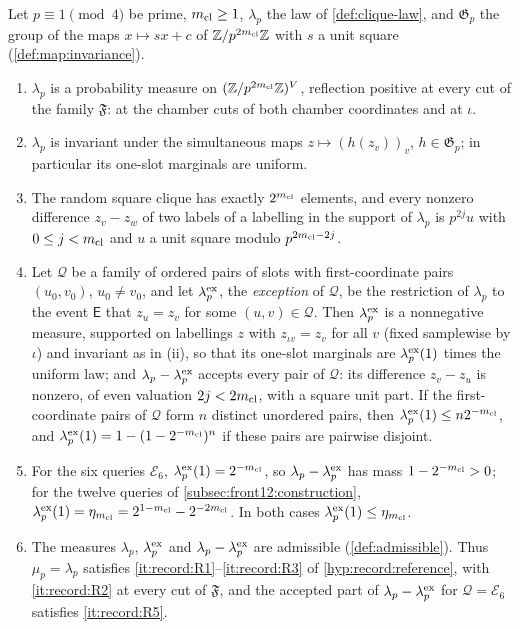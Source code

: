 \begin{lemma}\label{lem:frontier:iidlocal}
Let $p\equiv1\pmod4$ be prime, $m_{\mathrm{cl}}\ge1$, $\lambda_p$ the law of
\cref{def:clique-law}, and $\mathfrak G_p$ the group of the maps
$x\mapsto sx+c$ of $\mathbb Z/p^{2m_{\mathrm{cl}}}\mathbb Z$ with $s$ a unit square
(\cref{def:map:invariance}).
\begin{enumerate}[label=(\roman*)]
\item $\lambda_p$ is a probability measure on $(\mathbb Z/p^{2m_{\mathrm{cl}}}\mathbb Z)^V$, reflection
 positive at every cut of the family $\mathfrak F$: at the chamber cuts of both
 chamber coordinates and at $\iota$.
\item $\lambda_p$ is invariant under the simultaneous maps $z\mapsto(h(z_v))_v$,
 $h\in\mathfrak G_p$; in particular its one-slot marginals are uniform.
\item The random square clique has exactly $2^{m_{\mathrm{cl}}}$ elements, and every
 nonzero difference $z_v-z_w$ of two labels of a labelling in the support of
 $\lambda_p$ is $p^{2j}u$ with $0\le j<m_{\mathrm{cl}}$ and $u$ a unit square modulo
 $p^{2m_{\mathrm{cl}}-2j}$.
\item Let $\mathcal Q$ be a family of ordered pairs of slots with
 first-coordinate pairs $(u_0,v_0)$, $u_0\ne v_0$, and let $\lambda^{\rm ex}_p$,
 the \emph{exception} of $\mathcal Q$, be the restriction of $\lambda_p$ to the
 event $\mathsf E$ that $z_u=z_v$ for some $(u,v)\in\mathcal Q$. Then
 $\lambda^{\rm ex}_p$ is a nonnegative measure, supported on labellings $z$
with $z_{\iota v}=z_v$ for all $v$ (fixed samplewise by $\iota$) and
 invariant as in (ii), so that its one-slot marginals are $\lambda^{\rm ex}_p(1)$
 times the uniform law; and $\lambda_p-\lambda^{\rm ex}_p$ accepts every pair of
 $\mathcal Q$: its difference $z_v-z_u$ is nonzero, of even valuation
 $2j<2m_{\mathrm{cl}}$, with a square unit part. If the first-coordinate pairs of
 $\mathcal Q$ form $n$ distinct unordered pairs, then
 $\lambda^{\rm ex}_p(1)\le n2^{-m_{\mathrm{cl}}}$, and
 $\lambda^{\rm ex}_p(1)=1-(1-2^{-m_{\mathrm{cl}}})^n$ if these pairs are pairwise disjoint.
\item For the six queries $\mathcal E_6$, $\lambda^{\rm ex}_p(1)=2^{-m_{\mathrm{cl}}}$, so
 $\lambda_p-\lambda^{\rm ex}_p$ has mass $1-2^{-m_{\mathrm{cl}}}>0$; for the twelve queries
 of \cref{subsec:front12:construction},
 $\lambda^{\rm ex}_p(1)=\eta_{m_{\mathrm{cl}}}=2^{1-m_{\mathrm{cl}}}-2^{-2m_{\mathrm{cl}}}$. In both cases
 $\lambda^{\rm ex}_p(1)\le\eta_{m_{\mathrm{cl}}}$.
\item The measures $\lambda_p$, $\lambda^{\rm ex}_p$ and $\lambda_p-\lambda^{\rm ex}_p$
 are admissible (\cref{def:admissible}). Thus $\mu_p=\lambda_p$ satisfies
 \ref{it:record:R1}--\ref{it:record:R3} of \cref{hyp:record:reference}, with
 \ref{it:record:R2} at every cut of $\mathfrak F$, and the accepted part of
 $\lambda_p-\lambda^{\rm ex}_p$ for $\mathcal Q=\mathcal E_6$ satisfies
 \ref{it:record:R5}.
\end{enumerate}
\end{lemma}

